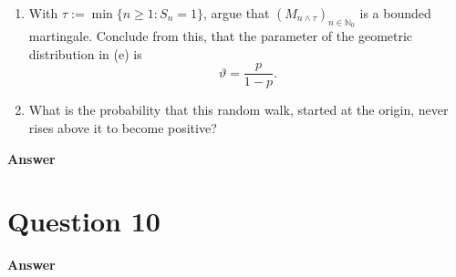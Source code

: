 \documentclass[letterpaper]{article}
\begin{document}
\begin{enumerate}
			\item[(f)] With $\tau := \min\{n \geq 1 : S_n = 1\}$, argue that $(M_{n \wedge \tau})_{n \in \mathbb{N}_0}$ is a bounded martingale. Conclude from this, that the parameter of the geometric distribution in (e) is
			\[
			\vartheta = \frac{p}{1-p}.
			\]
			
			\item[(g)] What is the probability that this random walk, started at the origin, never rises above it to become positive?
		\end{enumerate}
	
	
		
		\textbf{Answer}
		
		\clearpage
		
		\section{Question 10}
		
		\textbf{Answer}
		
		\clearpage
		
		
	
\end{document}
